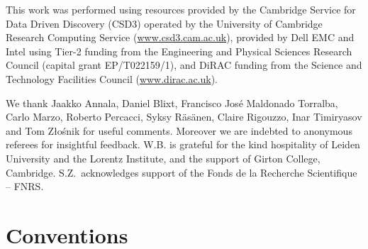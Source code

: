 \documentclass[aps,prd,reprint,preprintnumbers,showpacs,floatfix,nofootinbib,superscript address,longbibliography]{revtex4-1}
\begin{document}
\begin{acknowledgments}
This work was performed using resources provided by the Cambridge Service for Data Driven Discovery (CSD3) operated by the University of Cambridge Research Computing Service (\href{www.csd3.cam.ac.uk}{www.csd3.cam.ac.uk}), provided by Dell EMC and Intel using Tier-2 funding from the Engineering and Physical Sciences Research Council (capital grant EP/T022159/1), and DiRAC funding from the Science and Technology Facilities Council (\href{www.dirac.ac.uk}{www.dirac.ac.uk}).

We thank Jaakko Annala, Daniel Blixt, Francisco José Maldonado Torralba, Carlo Marzo, Roberto Percacci, Syksy Räsänen, Claire Rigouzzo, Inar Timiryasov and Tom Złośnik for useful comments. Moreover we are indebted to anonymous referees for insightful feedback. W.B. is grateful for the kind hospitality of Leiden University and the Lorentz Institute, and the support of Girton College, Cambridge. S.Z.~acknowledges support of the Fonds de la Recherche Scientifique -- FNRS.
\end{acknowledgments}

\appendix

\section{Conventions}\label{Conventions}
\end{document}
